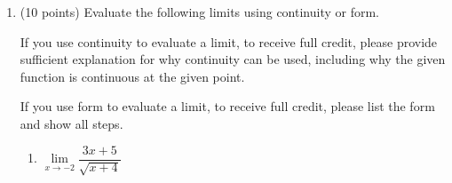 \documentclass[11pt]{article}
\begin{document}
\begin{enumerate}
\begin{enumerate}
\item On the interval $[-3, 4]$, for what $a$-value(s) does the limit $\lim\limits_{x\to a}f(x)$ NOT exist? For each value you write down, explain why the limit doesn't exist.

\vfill

\vfill


\item On the interval $[-3, 4]$, for what $a$-value(s) is $f(x)$ NOT continuous at $x=a$? For each point where there is a discontinuity, determine its type and explain why it belongs to that type.


\vfill

\vfill


\end{enumerate}


\newpage


\item (10 points) Evaluate the following limits using continuity or form.

If you use continuity to evaluate a limit, to receive full credit, please provide sufficient explanation for why continuity can be used, including why the given function is continuous at the given point.

If you use form to evaluate a limit, to receive full credit, please list the form and show all steps. 


\begin{enumerate}
    \item $\lim\limits_{x\to -2}\dfrac{3x+5}{\sqrt{x+4}}$


\end{enumerate}
\end{enumerate}
\end{document}
